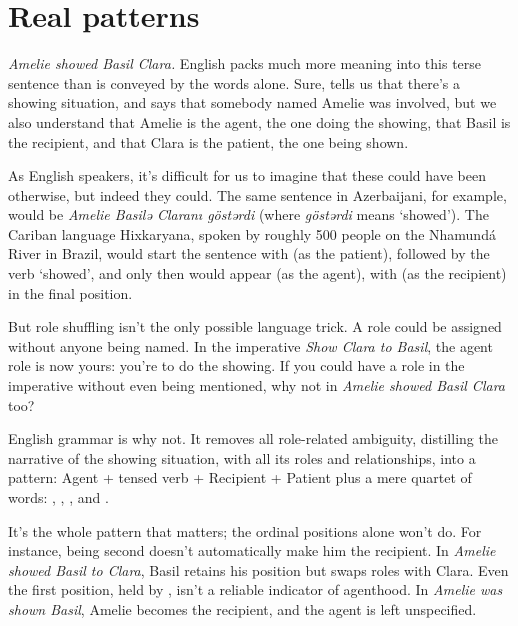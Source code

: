 \chapter{Real patterns}

\textit{Amelie showed Basil Clara.} English packs much more meaning into this terse sentence than is conveyed by the words alone. Sure,  tells us that there's a showing situation, and  says that somebody named Amelie was involved, but we also understand that Amelie is the agent, the one doing the showing, that Basil is the recipient, and that Clara is the patient, the one being shown.

As English speakers, it's difficult for us to imagine that these could have been otherwise, but indeed they could. The same sentence in Azerbaijani, for example, would be \textit{Amelie Basilə Claranı göstərdi} (where \textit{göstərdi} means `showed'). The Cariban language Hixkaryana, spoken by roughly 500 people on the Nhamundá River in Brazil, would start the sentence with  (as the patient), followed by the verb `showed', and only then would  appear (as the agent), with  (as the recipient) in the final position. %

But role shuffling isn't the only possible language trick. A role could be assigned without anyone being named. In the imperative \textit{Show Clara to Basil}, the agent role is now yours: you're to do the showing. If you could have a role in the imperative without even being mentioned, why not in \textit{Amelie showed Basil Clara} too?

English grammar is why not. It removes all role-related ambiguity, distilling the narrative of the showing situation, with all its roles and relationships, into a pattern: \textsf{Agent + tensed verb + Recipient + Patient} plus a mere quartet of words: , , , and . %

It's the whole pattern that matters; the ordinal positions alone won't do. For instance,  being second doesn't automatically make him the recipient. In \textit{Amelie showed Basil to Clara}, Basil retains his position but swaps roles with Clara. Even the first position, held by , isn't a reliable indicator of agenthood. In \textit{Amelie was shown Basil}, Amelie becomes the recipient, and the agent is left unspecified.


